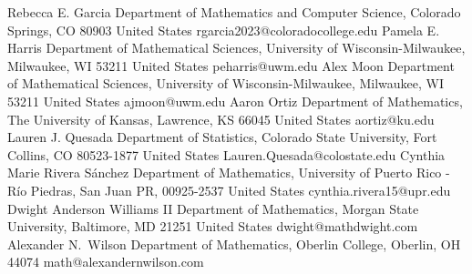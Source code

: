 \documentclass[11pt,reqno]{BICA}
\theoremstyle{definition}
\begin{document}




\begin{Contacts}
\AuthorAddress%
  {Rebecca E. Garcia}
  {Department of Mathematics and Computer Science, Colorado Springs, CO 80903 United States}
  {rgarcia2023@coloradocollege.edu}
\AuthorAddress%
  {Pamela E. Harris}
  {Department of Mathematical Sciences, University of Wisconsin-Milwaukee, Milwaukee, WI 53211 United States}
  {peharris@uwm.edu}
\AuthorAddress%
  {Alex Moon}
  {Department of Mathematical Sciences, University of Wisconsin-Milwaukee, Milwaukee, WI 53211 United States}
  {ajmoon@uwm.edu}
\AuthorAddress%
  {Aaron Ortiz}
  {Department of Mathematics, The University of Kansas, Lawrence, KS 66045 United States}
  {aortiz@ku.edu}
\AuthorAddress%
  {Lauren J. Quesada}
  {Department of Statistics, Colorado State University, Fort Collins, CO 80523-1877 United States}
  {Lauren.Quesada@colostate.edu}
\AuthorAddress%
  {Cynthia Marie Rivera S\'anchez}
  {Department of Mathematics, University of Puerto Rico - R\'io Piedras, San Juan PR, 00925-2537 United States}
  {cynthia.rivera15@upr.edu}
\AuthorAddress%
  {Dwight Anderson Williams II}
  {Department of Mathematics, Morgan State University, Baltimore, MD 21251 United States}
  {dwight@mathdwight.com}
\AuthorAddress%
  {Alexander N.~Wilson}
  {Department of Mathematics, Oberlin College, Oberlin, OH 44074}
  {math@alexandernwilson.com}
\end{Contacts}
\end{document}
